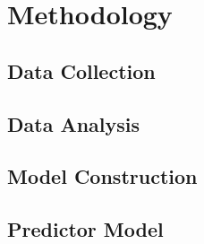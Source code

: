 \lipsum[3-6]

\chapter{Methodology}

\section{Data Collection}

\section{Data Analysis}

\section{Model Construction}

\section{Predictor Model}
